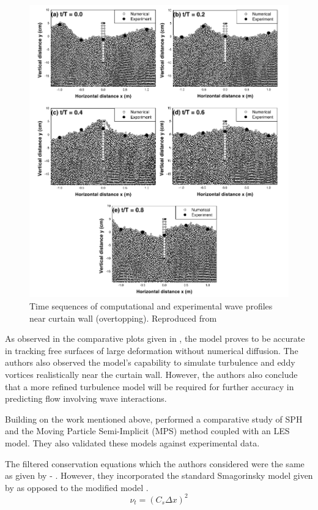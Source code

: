 \begin{figure}[H]
    \centering
    \includegraphics[width=12cm]{Figures/research_papers/gotoh2004-wave-profile-result.png}
    \caption{Time sequences of computational and experimental wave profiles near curtain wall (overtopping). Reproduced from \cite{Gotoh2004}}
    \label{fig:gotoh2004-wave-profile-result}
\end{figure}

As observed in the comparative plots given in , the model proves to be accurate in tracking free surfaces of large deformation without numerical diffusion. The authors also observed the model’s capability to simulate turbulence and eddy vortices realistically near the curtain wall. However, the authors also conclude that a more refined turbulence model will be required for further accuracy in predicting flow involving wave interactions.

Building on the work mentioned above, \cite{Shao2005} performed a comparative study of SPH and the Moving Particle Semi-Implicit (MPS) method coupled with an LES model. They also validated these models against experimental data.

The filtered conservation equations which the authors considered were the same as given by  - . However, they incorporated the standard Smagorinsky model \parencite{smagorinsky1963general} given by  as opposed to the modified model .
\begin{equation}
    \nu_t = (C_s \Delta x)^2
    \label{eq:Shao2005-eddy-visc}
\end{equation}

